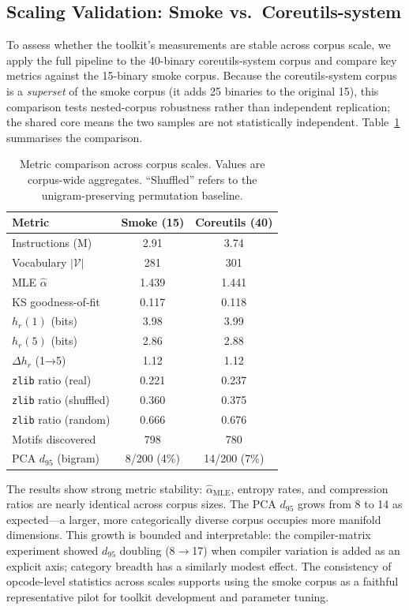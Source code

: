 \documentclass[10pt,twocolumn]{article}
\newcommand{\zlib}{\texttt{zlib}}
\begin{document}
\subsection{Scaling Validation: Smoke vs.\ Coreutils-system}
\label{sec:scaling}

To assess whether the toolkit's measurements are stable across corpus scale,
we apply the full pipeline to the 40-binary coreutils-system corpus and
compare key metrics against the 15-binary smoke corpus.
Because the coreutils-system corpus is a \emph{superset} of the smoke
corpus (it adds 25 binaries to the original 15), this comparison tests
nested-corpus robustness rather than independent replication; the shared
core means the two samples are not statistically independent.
Table~\ref{tab:scaling} summarises the comparison.

\begin{table}[h]
\centering
\caption{Metric comparison across corpus scales.  Values are corpus-wide
  aggregates.  ``Shuffled'' refers to the unigram-preserving permutation
  baseline.}
\label{tab:scaling}
\small
\begin{tabular}{@{}lcc@{}}
\toprule
\textbf{Metric} & \textbf{Smoke (15)} & \textbf{Coreutils (40)} \\
\midrule
Instructions (M)         & 2.91  & 3.74  \\
Vocabulary $|\mathcal{V}|$   & 281   & 301   \\
MLE $\hat{\alpha}$       & 1.439 & 1.441 \\
KS goodness-of-fit       & 0.117 & 0.118 \\
$h_r(1)$ (bits)          & 3.98  & 3.99  \\
$h_r(5)$ (bits)          & 2.86  & 2.88  \\
$\Delta h_r$ (1→5)       & 1.12  & 1.12  \\
\zlib{} ratio (real)     & 0.221 & 0.237 \\
\zlib{} ratio (shuffled) & 0.360 & 0.375 \\
\zlib{} ratio (random)   & 0.666 & 0.676 \\
Motifs discovered        & 798   & 780   \\
PCA $d_{95}$ (bigram)    & 8/200 (4\%) & 14/200 (7\%) \\
\bottomrule
\end{tabular}
\end{table}

The results show strong metric stability: $\hat{\alpha}_{\text{MLE}}$,
entropy rates, and compression ratios are nearly identical across corpus
sizes.  The PCA $d_{95}$ grows from 8 to 14 as expected---a larger, more
categorically diverse corpus occupies more manifold dimensions.  This
growth is bounded and interpretable: the compiler-matrix experiment showed
$d_{95}$ doubling (8$\to$17) when compiler variation is added as an
explicit axis; category breadth has a similarly modest effect.
The consistency of opcode-level statistics across scales supports using
the smoke corpus as a faithful representative pilot for toolkit development
and parameter tuning.
\end{document}

